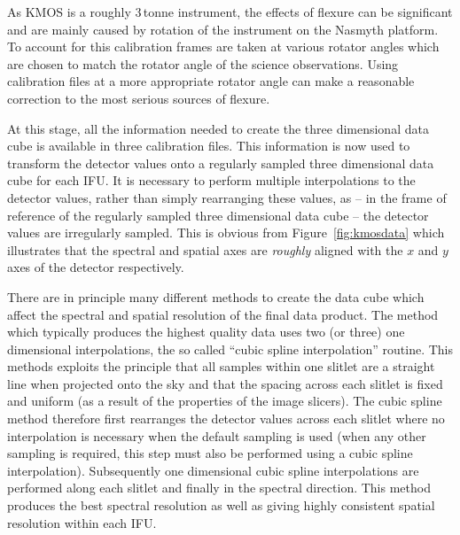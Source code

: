 As KMOS is a roughly 3\,tonne instrument, the effects of flexure can be significant and are mainly caused by rotation of the instrument on the Nasmyth platform.
To account for this calibration frames are taken at various rotator angles which are chosen to match the rotator angle of the science observations.
Using calibration files at a more appropriate rotator angle can make a reasonable correction to the most serious sources of flexure.

At this stage, all the information needed to create the three dimensional data cube is available in three calibration files.
This information is now used to transform the detector values onto a regularly sampled three dimensional data cube for each IFU.
It is necessary to perform multiple interpolations to the detector values, rather than simply rearranging these values, as -- in the frame of reference of the regularly sampled three dimensional data cube -- the detector values are irregularly sampled.
This is obvious from Figure~\ref{fig:kmosdata} which illustrates that the spectral and spatial axes are \textit{roughly} aligned with the $x$ and $y$ axes of the detector respectively.

There are in principle many different methods to create the data cube which affect the spectral and spatial resolution of the final data product.
The method which typically produces the highest quality data uses two (or three) one dimensional interpolations, the so called ``cubic spline interpolation'' routine.
This methods exploits the principle that all samples within one slitlet are a straight line when projected onto the sky and that the spacing across each slitlet is fixed and uniform (as a result of the properties of the image slicers).
The cubic spline method therefore first rearranges the detector values across each slitlet where no interpolation is necessary when the default sampling is used (when any other sampling is required, this step must also be performed using a cubic spline interpolation).
Subsequently one dimensional cubic spline interpolations are performed along each slitlet and finally in the spectral direction.
This method produces the best spectral resolution as well as giving highly consistent spatial resolution within each IFU.

